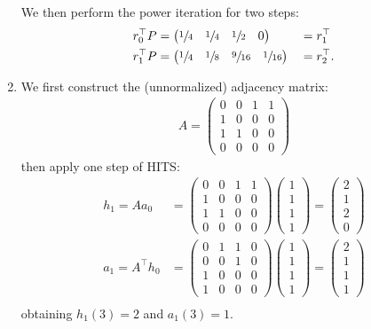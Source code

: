 \begin{enumerate}
  We then perform the power iteration for two steps:
  \begin{alignat*}{2}
    r_0^\top P &=
      \begin{pmatrix}
        \sfrac{1}{4}&\sfrac{1}{4}&\sfrac{1}{2}&0
      \end{pmatrix} &&= r_1^\top \\
    r_1^\top P &=
      \begin{pmatrix}
        \sfrac{1}{4}&\sfrac{1}{8}&\sfrac{9}{16}&\sfrac{1}{16}
      \end{pmatrix} &&= r_2^\top.
  \end{alignat*}

  \item We first construct the (unnormalized) adjacency matrix:
  \begin{align*}
    A =
    \begin{pmatrix}
      0&0&1&1 \\
      1&0&0&0 \\
      1&1&0&0 \\
      0&0&0&0
    \end{pmatrix}
  \end{align*}
  then apply one step of HITS:
  \begin{align*}
    h_1 = Aa_0 &=
    \begin{pmatrix}
      0&0&1&1 \\
      1&0&0&0 \\
      1&1&0&0 \\
      0&0&0&0
    \end{pmatrix}
    \begin{pmatrix}
      1\\1\\1\\1
    \end{pmatrix}
    =
    \begin{pmatrix}
      2\\1\\2\\0
    \end{pmatrix}\\
    a_1 = A^\top h_0 &=
    \begin{pmatrix}
      0&1&1&0 \\
      0&0&1&0 \\
      1&0&0&0 \\
      1&0&0&0
    \end{pmatrix}
    \begin{pmatrix}
      1\\1\\1\\1
    \end{pmatrix}
    =
    \begin{pmatrix}
      2\\1\\1\\1
    \end{pmatrix}\\
  \end{align*}
  obtaining $h_1(3) = 2$ and $a_1(3) = 1$.


\end{enumerate}
